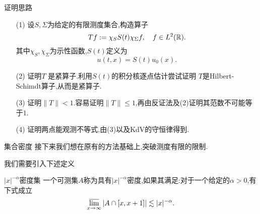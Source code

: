 \begin{frame}[t]{证明思路}

\begin{enumerate}
  \item [(1)] 设$S,\Sigma$为给定的有限测度集合,构造算子
    \begin{equation}
      Tf:=\chi_{S} S(t)\chi_{\Sigma}f ,\quad f\in L^2(\mathbb{R}). 
    \end{equation}
    其中$\chi_S,\chi_\Sigma$为示性函数,$S(t)$定义为
   \begin{equation}
     u(t,x)=S(t)u_0(x).
   \end{equation}
\item [(2)] 证明$T$ 是紧算子.利用$S(t)$的积分核逐点估计尝试证明 $T$是Hilbert-Schimdt算子,从而是紧算子.
\item [(3)] 证明$\|T\|<1$.容易证明$\|T\|\le 1$,再由反证法及(2)证明其范数不可能等于$1$.
\item [(4)]  证明两点能观测不等式,由(3)以及KdV的守恒律得到.
\end{enumerate} 
\end{frame}
\iffalse
\begin{frame}[t]
  The strategy to prove (\ref{7}) is to construct the operator
  \begin{equation}\label{8}
    Tf := \chi_{S}S(-t)\left( \chi_{\Sigma}S(t)f \right).  
  \end{equation}
  and claim that $T$ is a compact operator and $\|T\|<1$.

 \begin{equation}
   Tf(x)=\int \chi_{S}(x)\left( \int E(-t,x-w)\chi_\Sigma(w) E(t,w-y)\,\mathrm{d}w \right) f(y)\,\mathrm{d}y.
 \end{equation}
 Define $K(x,y)=\chi_S(x)\int E(-t,x-w)\chi_{\Sigma}(w)E(t,w-y)\,\mathrm{d}w $. Then 
\begin{equation}
  Tf(x)= \int K(x,y)f(y)\,\mathrm{d}y.
\end{equation}

\end{frame}
\fi
\begin{frame}[t]{集合密度}
  接下来我们想在原有的方法基础上,突破测度有限的限制.

  我们需要引入下述定义
  \begin{block}{$|x|^{-\alpha}$密度集}
    一个可测集$A$称为具有$|x|^{-\alpha}$密度,如果其满足:对于一个给定的$\alpha>0$,有下式成立
    \begin{equation}
      \varlimsup_{x\to \infty}|A\cap [x,x+1]|\lesssim|x|^{-\alpha}.
    \end{equation}
  \end{block}
\end{frame}

